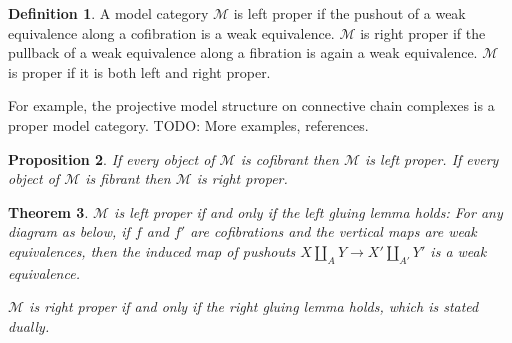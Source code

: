 \documentclass{scrartcl}
\let\emph\relax
\theoremstyle{plain}
\newtheorem{theorem}{Theorem}[section]
\newtheorem{proposition}[theorem]{Proposition}
\theoremstyle{definition}
\newtheorem{definition}[theorem]{Definition}
\newcommand{\cat}[1]{\mathcal{#1}}
\newcommand{\nto}{\Rightarrow}
\renewcommand{\coprod}{\mathbin{\amalg}}
\DeclareMathOperator{\Ho}{Ho}
\newcommand{\comp}{\mathbin{\circ}}
\begin{document}
\begin{definition}
    A model category $\cat M$ is left proper if the pushout of a weak equivalence along a cofibration is a weak equivalence. $\cat M$ is right proper if the pullback of a weak equivalence along a fibration is again a weak equivalence. $\cat M$ is proper if it is both left and right proper.
\end{definition}

For example, the projective model structure on connective chain complexes is a proper model category. TODO: More examples, references.

\begin{proposition}
    If every object of $\cat M$ is cofibrant then $\cat M$ is left proper. If every object of $\cat M$ is fibrant then $\cat M$ is right proper.
\end{proposition}

\begin{theorem}
    $\cat M$ is left proper if and only if the left gluing lemma holds: For any diagram as below, if $f$ and $f'$ are cofibrations and the vertical maps are weak equivalences, then the induced map of pushouts $X\coprod_A Y\to X'\coprod_{A'} Y'$ is a weak equivalence.

    \begin{center}
    \end{center}


    $\cat M$ is right proper if and only if the right gluing lemma holds, which is stated dually.
\end{theorem}

    
\end{document}
